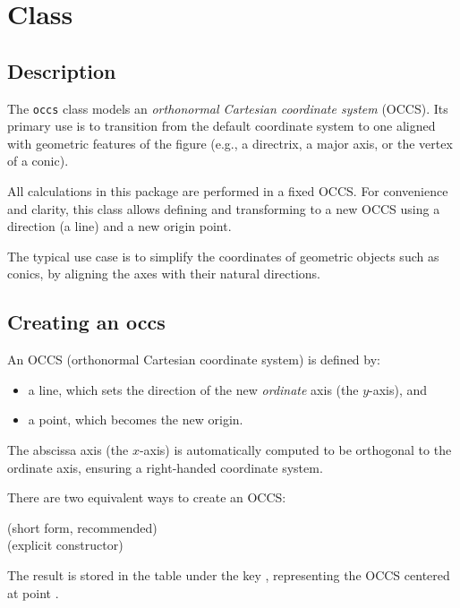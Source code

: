 \newpage
\section{Class }
\label{sec:orthonormal_cartesian_coordinate_system}

\subsection{Description}
The \texttt{occs} class models an \emph{orthonormal Cartesian coordinate system} (OCCS). Its primary use is to transition from the default coordinate system to one aligned with geometric features of the figure (e.g., a directrix, a major axis, or the vertex of a conic).

All calculations in this package are performed in a fixed OCCS. For convenience and clarity, this class allows defining and transforming to a new OCCS using a direction (a line) and a new origin point.

\medskip

The typical use case is to simplify the coordinates of geometric objects such as conics, by aligning the axes with their natural directions.

\subsection{Creating an occs}\label{occs:create}

An OCCS (orthonormal Cartesian coordinate system) is defined by:
\begin{itemize}
  \item a line, which sets the direction of the new \emph{ordinate} axis (the $y$-axis), and
  \item a point, which becomes the new origin.
\end{itemize}

The abscissa axis (the $x$-axis) is automatically computed to be orthogonal to the ordinate axis, ensuring a right-handed coordinate system.

\medskip

There are two equivalent ways to create an OCCS:

\begin{mybox}
   \hfill (short form, recommended)
  \\
   \hfill (explicit constructor)
\end{mybox}

The result is stored in the table  under the key , representing the OCCS centered at point .

